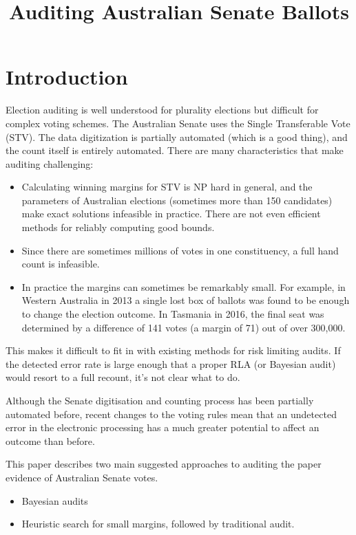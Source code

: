 \documentclass[10pt,a4paper]{article}
\begin{document}
\title{Auditing Australian Senate Ballots}

\section{Introduction}
Election auditing is well understood for plurality elections but difficult for complex voting schemes.  The Australian Senate uses the Single Transferable Vote (STV).  The data digitization is partially automated (which is a good thing), and the count itself is entirely automated.  There are many characteristics that make auditing challenging:

\begin{itemize}
\item Calculating winning margins for STV is NP hard in general, and the parameters of Australian elections (sometimes more than 150 candidates) make exact solutions infeasible in practice.  There are not even efficient methods for reliably computing good bounds. 	
\item Since there are sometimes millions of votes in one constituency, a full hand count is infeasible.
\item In practice the margins can sometimes be remarkably small.  For example, in Western Australia in 2013 a single lost box of ballots was found to be enough to change the election outcome.  In Tasmania in 2016, the final seat was determined by a difference of 141 votes 
(a margin of 71) out of over 300,000.	
\end{itemize}

This makes it difficult to fit in with existing methods for risk limiting audits. If the detected error rate is large enough
that a proper RLA (or Bayesian audit) would resort to a full recount, it's not clear what to do.  

Although the Senate digitisation and counting process has been partially automated before, recent changes to the voting rules mean that an undetected error in the electronic processing has a much greater potential to affect an outcome than before.

This paper describes two main suggested approaches to auditing the paper evidence of Australian Senate votes.  
\begin{itemize}
	\item Bayesian audits~\cite{rivest2012bayesian} 
	\item Heuristic search for small margins, followed by traditional audit.
\end{itemize}
\end{document}

